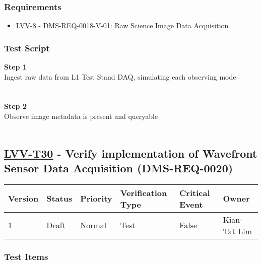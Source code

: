\hypertarget{requirements-119}{%
\subsubsection{Requirements}\label{requirements-119}}

\begin{itemize}
\tightlist
\item
  \href{https://jira.lsstcorp.org/browse/LVV-8}{LVV-8} -
  DMS-REQ-0018-V-01: Raw Science Image Data Acquisition
\end{itemize}

\hypertarget{test-script-119}{%
\subsubsection{Test Script}\label{test-script-119}}

\textbf{Step 1}\\
{Ingest raw data from L1 Test Stand DAQ, simulating each observing
mode\\
}~\\
~\\
\textbf{Step 2}\\
O{bserve image metadata is present and queryable}\\
~\\

\hypertarget{lvv-t30---verify-implementation-of-wavefront-sensor-data-acquisition-dms-req-0020}{%
\subsection{\texorpdfstring{\href{https://jira.lsstcorp.org/secure/Tests.jspa\#/testCase/LVV-T30}{LVV-T30}
- Verify implementation of Wavefront Sensor Data Acquisition
(DMS-REQ-0020)}{LVV-T30 - Verify implementation of Wavefront Sensor Data Acquisition (DMS-REQ-0020)}}\label{lvv-t30---verify-implementation-of-wavefront-sensor-data-acquisition-dms-req-0020}}

\begin{longtable}[]{@{}llllll@{}}
\toprule
Version & Status & Priority & Verification Type & Critical Event &
Owner\tabularnewline
\midrule
\endhead
1 & Draft & Normal & Test & False & Kian-Tat Lim\tabularnewline
\bottomrule
\end{longtable}

\hypertarget{test-items-119}{%
\subsubsection{Test Items}\label{test-items-119}}

